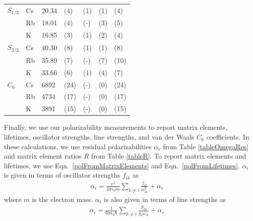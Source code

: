 \documentclass[twocolumn,prl,showpacs,superscriptaddress]{revtex4-1}   %
\newcommand{\eqnref}[1]{Eqn.~\eqref{#1}}
\begin{document}
\begin{table}
\begin{center}
\begin{tabular}{lllllll}
$S_{1/2}$ 			& Cs & 20.34 & (4) & (1) & (1) & (4) \\
 					& Rb & 18.01 & (4) & (-) & (3) & (5) \\
 					& K  & 16.85 & (3) & (1) & (2) & (4) \\ \hline
$S_{3/2}$ 			& Cs & 40.30 & (8) & (1) & (1) & (8) \\
 					& Rb & 35.89 & (7) & (-) & (7) & (10) \\
 					& K  & 33.66 & (6) & (1) & (4) & (7) \\ \hline
$C_6$ 				& Cs & 6892 & (24) & (-) & (0) & (24) \\ 
					& Rb & 4734 & (17) & (-) & (0) & (17) \\
 					& K  & 3891 & (15) & (-) & (0) & (15) \\ \hline
\hline
\end{tabular}
\end{center}
\end{table}
\endgroup


Finally, we use our polarizability measurements to report matrix elements, lifetimes, oscillator strengths, line strengths, and van der Waals $C_6$ coefficients.
In these calculations, we use residual polarizabilities $\alpha_r$ from Table \ref{tableOmegaRes} and matrix element ratios $R$
from Table \ref{tableR}.
To report matrix elements and lifetimes, we use \eqnref{polFromMatrixElements} and \eqnref{polFromLifetimes}. $\alpha_i$ is given in terms of oscillator strengths $f_{ik}$ as 
\begin{align}
	\alpha_i = \frac{e^2}{4 \pi \epsilon_0 m}
	\sum_{k \neq i}
	\frac{f_{ik}}{w_{ik}^2}
	+ \alpha_r
	\label{polFromOscStr}
\end{align}
where $m$ is the electron mass. 
$\alpha_i$ is also given in terms of line strengths as
\begin{align}
	\alpha_i = \frac{1}{6\pi\epsilon_0\hbar} 
	\sum_{k \neq i} 
	\frac{S_{ki}}{g_i\omega_{ik}}
	+ \alpha_r
	\label{polFromLineStr}
\end{align}
\end{document}
